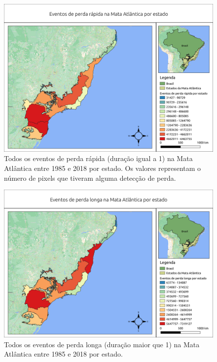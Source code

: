 \begin{figure}[H]
    \centering
    \includegraphics[scale=.5]{images/estados_loss_masked85_maskedGain_eq1.png}
    \caption{Todos os eventos de perda rápida (duração igual a 1) na Mata Atlântica entre 1985 e 2018 por estado. Os valores representam o número de pixels que tiveram alguma detecção de perda.}
    \label{fig:estados_loss_masked85_maskedgain_eq1}
\end{figure}

\begin{figure}[H]
    \centering
    \includegraphics[scale=.5]{images/estados_loss_masked85_maskedGain_neq1.png}
    \caption{Todos os eventos de perda longa (duração maior que 1) na Mata Atlântica entre 1985 e 2018 por estado.}
    \label{fig:estados_loss_masked85_maskedgain_neq1}
\end{figure}

